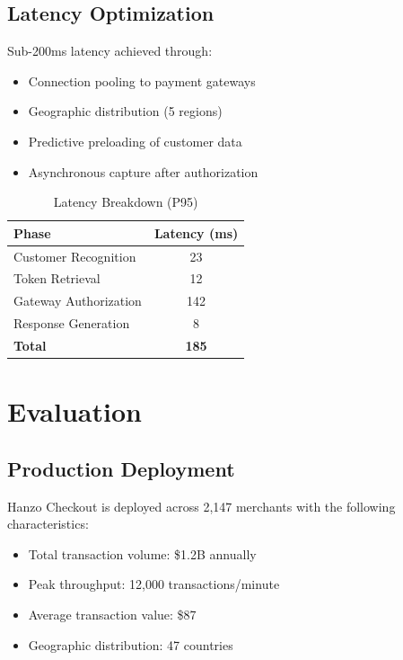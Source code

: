 \documentclass[11pt,a4paper]{article}
\begin{document}
\subsection{Latency Optimization}

Sub-200ms latency achieved through:

\begin{itemize}
    \item Connection pooling to payment gateways
    \item Geographic distribution (5 regions)
    \item Predictive preloading of customer data
    \item Asynchronous capture after authorization
\end{itemize}

\begin{table}[h]
\centering
\caption{Latency Breakdown (P95)}
\begin{tabular}{lc}
\toprule
\textbf{Phase} & \textbf{Latency (ms)} \\
\midrule
Customer Recognition & 23 \\
Token Retrieval & 12 \\
Gateway Authorization & 142 \\
Response Generation & 8 \\
\midrule
\textbf{Total} & \textbf{185} \\
\bottomrule
\end{tabular}
\end{table}

\section{Evaluation}

\subsection{Production Deployment}

Hanzo Checkout is deployed across 2,147 merchants with the following characteristics:

\begin{itemize}
    \item Total transaction volume: \$1.2B annually
    \item Peak throughput: 12,000 transactions/minute
    \item Average transaction value: \$87
    \item Geographic distribution: 47 countries
\end{itemize}
\end{document}
